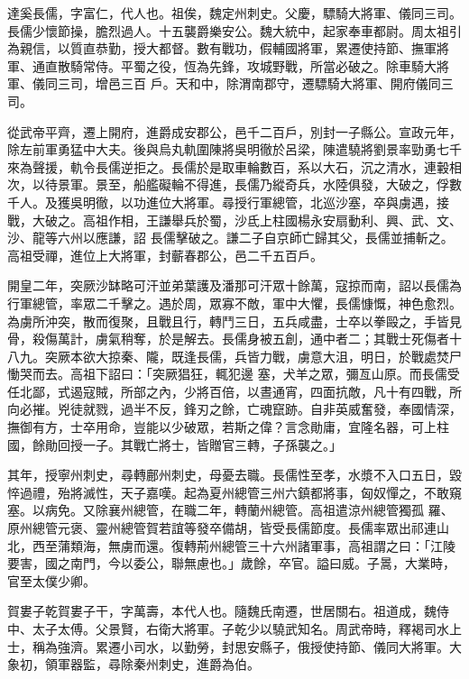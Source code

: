 
\begin{pinyinscope}

 達奚長儒，字富仁，代人也。祖俟，魏定州刺史。父慶，驃騎大將軍、儀同三司。長儒少懷節操，膽烈過人。十五襲爵樂安公。魏大統中，起家奉車都尉。周太祖引為親信，以質直恭勤，授大都督。數有戰功，假輔國將軍，累遷使持節、撫軍將軍、通直散騎常侍。平蜀之役，恆為先鋒，攻城野戰，所當必破之。除車騎大將軍、儀同三司，增邑三百
 戶。天和中，除渭南郡守，遷驃騎大將軍、開府儀同三司。



 從武帝平齊，遷上開府，進爵成安郡公，邑千二百戶，別封一子縣公。宣政元年，除左前軍勇猛中大夫。後與烏丸軌圍陳將吳明徹於呂梁，陳遣驍將劉景率勁勇七千來為聲援，軌令長儒逆拒之。長儒於是取車輪數百，系以大石，沉之清水，連轂相次，以待景軍。景至，船艦礙輪不得進，長儒乃縱奇兵，水陸俱發，大破之，俘數千人。及獲吳明徹，以功進位大將軍。尋授行軍總管，北巡沙塞，卒與虜遇，接戰，大破之。高祖作相，王謙舉兵於蜀，沙氐上柱國楊永安扇動利、興、武、文、沙、龍等六州以應謙，詔
 長儒擊破之。謙二子自京師亡歸其父，長儒並捕斬之。高祖受禪，進位上大將軍，封蘄春郡公，邑二千五百戶。



 開皇二年，突厥沙缽略可汗並弟葉護及潘那可汗眾十餘萬，寇掠而南，詔以長儒為行軍總管，率眾二千擊之。遇於周，眾寡不敵，軍中大懼，長儒慷慨，神色愈烈。為虜所沖突，散而復聚，且戰且行，轉鬥三日，五兵咸盡，士卒以拳毆之，手皆見骨，殺傷萬計，虜氣稍奪，於是解去。長儒身被五創，通中者二；其戰士死傷者十八九。突厥本欲大掠秦、隴，既逢長儒，兵皆力戰，虜意大沮，明日，於戰處焚尸慟哭而去。高祖下詔曰：「突厥猖狂，輒犯邊
 塞，犬羊之眾，彌亙山原。而長儒受任北鄙，式遏寇賊，所部之內，少將百倍，以晝通宵，四面抗敵，凡十有四戰，所向必摧。兇徒就戮，過半不反，鋒刃之餘，亡魂竄跡。自非英威奮發，奉國情深，撫御有方，士卒用命，豈能以少破眾，若斯之偉？言念勛庸，宜隆名器，可上柱國，餘勛回授一子。其戰亡將士，皆贈官三轉，子孫襲之。」



 其年，授寧州刺史，尋轉鄜州刺史，母憂去職。長儒性至孝，水漿不入口五日，毀悴過禮，殆將滅性，天子嘉嘆。起為夏州總管三州六鎮都將事，匈奴憚之，不敢窺塞。以病免。又除襄州總管，在職二年，轉蘭州總管。高祖遣涼州總管獨孤
 羅、原州總管元褒、靈州總管賀若誼等發卒備胡，皆受長儒節度。長儒率眾出祁連山北，西至蒲類海，無虜而還。復轉荊州總管三十六州諸軍事，高祖謂之曰：「江陵要害，國之南門，今以委公，聯無慮也。」歲餘，卒官。謚曰威。子暠，大業時，官至太僕少卿。



 賀婁子乾賀婁子干，字萬壽，本代人也。隨魏氏南遷，世居關右。祖道成，魏侍中、太子太傅。父景賢，右衛大將軍。子乾少以驍武知名。周武帝時，釋褐司水上士，稱為強濟。累遷小司水，以勤勞，封思安縣子，俄授使持節、儀同大將軍。大
 象初，領軍器監，尋除秦州刺史，進爵為伯。




\end{pinyinscope}

